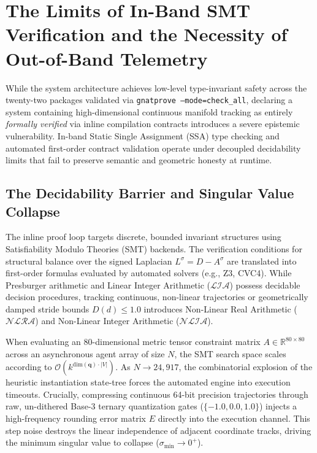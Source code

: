 
\section{The Limits of In-Band SMT Verification and the Necessity of Out-of-Band Telemetry}

While the system architecture achieves low-level type-invariant safety across the twenty-two packages validated via \texttt{gnatprove --mode=check\_all}, declaring a system containing high-dimensional continuous manifold tracking as entirely \textit{formally verified} via inline compilation contracts introduces a severe epistemic vulnerability. In-band Static Single Assignment (SSA) type checking and automated first-order contract validation operate under decoupled decidability limits that fail to preserve semantic and geometric honesty at runtime.

\subsection{The Decidability Barrier and Singular Value Collapse}
The inline proof loop targets discrete, bounded invariant structures using Satisfiability Modulo Theories (SMT) backends. The verification conditions for structural balance over the signed Laplacian $L^\sigma = D - A^\sigma$ are translated into first-order formulas evaluated by automated solvers (e.g., Z3, CVC4). While Presburger arithmetic and Linear Integer Arithmetic ($\mathcal{L}\mathcal{I}\mathcal{A}$) possess decidable decision procedures, tracking continuous, non-linear trajectories or geometrically damped stride bounds $D(d) \le 1.0$ introduces Non-Linear Real Arithmetic ($\mathcal{N}\mathcal{L}\mathcal{R}\mathcal{A}$) and Non-Linear Integer Arithmetic ($\mathcal{N}\mathcal{L}\mathcal{I}\mathcal{A}$).

When evaluating an $80$-dimensional metric tensor constraint matrix $A \in \mathbb{R}^{80 \times 80}$ across an asynchronous agent array of size $N$, the SMT search space scales according to $\mathcal{O}(k^{\mathrm{dim}(\mathbf{q}) \cdot |V|})$. As $N \to 24,917$, the combinatorial explosion of the heuristic instantiation state-tree forces the automated engine into execution timeouts. Crucially, compressing continuous 64-bit precision trajectories through raw, un-dithered Base-3 ternary quantization gates ($\{-1.0, 0.0, 1.0\}$) injects a high-frequency rounding error matrix $E$ directly into the execution channel. This step noise destroys the linear independence of adjacent coordinate tracks, driving the minimum singular value to collapse ($\sigma_{\min} \to 0^+$). 

